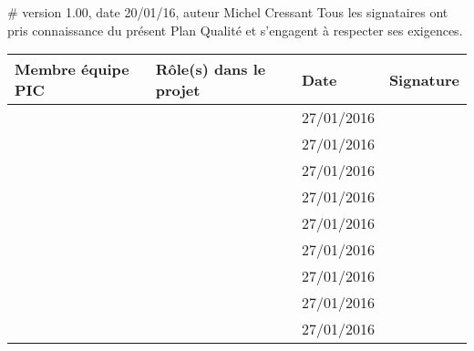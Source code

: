 # version 1.00, date 20/01/16, auteur Michel Cressant
Tous les signataires ont pris connaissance du présent Plan Qualité et s'engagent à respecter ses exigences. \\
	
	\vspace{1cm}

\begin{tabular}[h]{|p{}|p{}|p{}|p{}|}
	\hline
	
	\cellcolor{gray!40}Membre équipe PIC & \cellcolor{gray!40}Rôle(s) dans le projet & \cellcolor{gray!40}Date & \cellcolor{gray!40}Signature \\\hline
	\Sergi & \CP & 27/01/2016 &  \\\hline
	\Pierre & \RQ \newline \CPA & 27/01/2016 &  \\\hline
	\Michel & \D \newline \RD & 27/01/2016 &  \\\hline
	\Kafui & \D \newline \RQA & 27/01/2016 &  \\\hline
	\Matthieu & \D \newline \RRS & 27/01/2016 &  \\\hline
	\Mathieu & \D \newline \RGC & 27/01/2016 &  \\\hline
	\Melissa & \D & 27/01/2016 &  \\\hline
	\Julie & \D & 27/01/2016 &  \\\hline
	\Florian & \D & 27/01/2016 &  \\\hline
\end{tabular}

